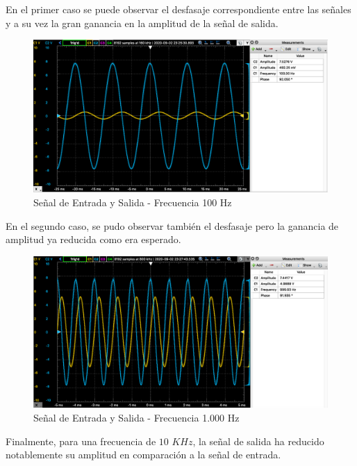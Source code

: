 En el primer caso se puede observar el desfasaje correspondiente entre las señales y a su vez la gran ganancia en la amplitud de la señal de salida.

\begin{figure}[H]
    \centering 
    \includegraphics [scale=0.4] {../Ejercicio3-CircuitoIntegradoresyDerivadores/Imagenes/senoidal - 100.png} 
    \caption{Señal de Entrada y Salida - Frecuencia 100 Hz}
    \label{fig:emptyPlotTool}
\end{figure}

En el segundo caso, se pudo observar también el desfasaje pero la ganancia de amplitud ya reducida como era esperado.

\begin{figure}[H]
    \centering 
    \includegraphics [scale=0.4] {../Ejercicio3-CircuitoIntegradoresyDerivadores/Imagenes/senoidal - 1000.png} 
    \caption{Señal de Entrada y Salida - Frecuencia 1.000 Hz }
    \label{fig:emptyPlotTool}
\end{figure}

Finalmente, para una frecuencia de $10$ $KHz$, la señal de salida ha reducido notablemente su amplitud en comparación a la señal de entrada. 

